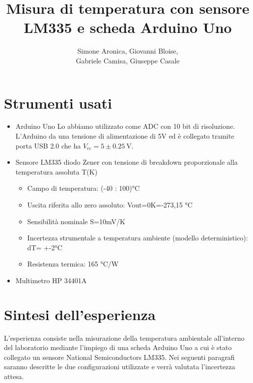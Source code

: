 \documentclass{article}
\title{Misura di temperatura con
sensore LM335 e
scheda Arduino Uno}
\author{Simone Aronica, Giovanni Bloise, \\
Gabriele Camisa, Giuseppe Casale}
\date{}
\begin{document}
\maketitle
\tableofcontents
\pagebreak

\section{Strumenti usati}
\begin{itemize}
    \item Arduino Uno
    Lo abbiamo utilizzato come ADC con 10 bit di risoluzione. L'Arduino da una tensione di alimentazione di 5V ed è collegato tramite porta USB 2.0 che ha $V_{\text{cc}} = 5 \pm \SI{0.25}{\volt}$.
    \item Sensore LM335
    diodo Zener con tensione di breakdown proporzionale alla temperatura assoluta T(K)
    \begin{itemize}
        \item Campo di temperatura: (-40 : 100)°C
        \item Uscita riferita allo zero assoluto: Vout=0K=-273,15 °C
        \item Sensibilità nominale S=10mV/K
        \item Incertezza strumentale a temperatura ambiente (modello deterministico): dT= +-2°C
        \item Resistenza termica: 165 °C/W
    \end{itemize}
    \item Multimetro HP 34401A
\end{itemize}

\section{Sintesi dell'esperienza}
L'esperienza consiste nella misurazione della temperatura ambientale all'interno del laboratorio mediante l'impiego di una scheda Arduino Uno a cui è stato collegato un sensore National Semiconductors LM335. Nei seguenti paragrafi saranno descritte le due configurazioni utilizzate e verrà valutata l'incertezza attesa.
\end{document}

